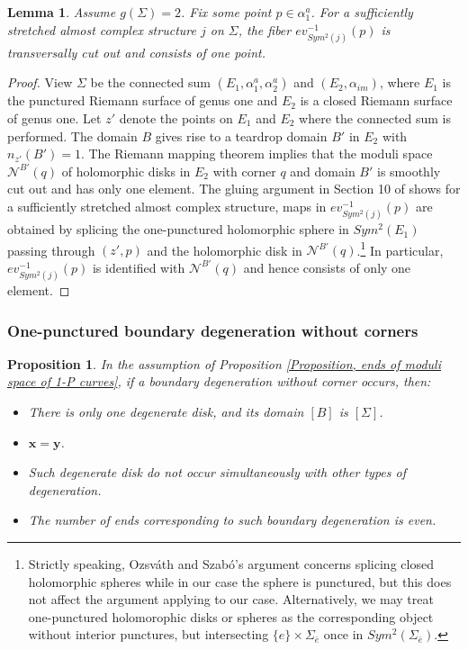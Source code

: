 \documentclass{amsart}
\newtheorem{lem}[thm]{Lemma}
\newtheorem{prop}[thm]{Proposition}
\theoremstyle{definition}
\theoremstyle{remark}
\numberwithin{equation}{section}
\numberwithin{equation}{section} \makeatletter
\begin{document}
\begin{lem}\label{Lemma, fiber of a 1-punctured degenerate disks using sufficiently stretched almost complex structure}
Assume $g(\Sigma)=2$. Fix some point $p\in \alpha^a_1$. For a sufficiently stretched almost complex structure $j$ on $\Sigma$, the fiber $ev_{Sym^2(j)}^{-1}(p)$ is transversally cut out and consists of one point. 
\end{lem}
\begin{proof}
View $\Sigma$ be the connected sum $(E_1,\alpha^a_1,\alpha^a_2)$ and $(E_2,\alpha_{im})$, where $E_1$ is the punctured Riemann surface of genus one and $E_2$ is a closed Riemann surface of genus one. Let $z'$ denote the points on $E_1$ and $E_2$ where the connected sum is performed. The domain $B$ gives rise to a teardrop domain $B'$ in $E_2$ with $n_{z'}(B')=1$. The Riemann mapping theorem implies that the moduli space $\mathcal{N}^{B'}(q)$ of holomorphic disks in $E_2$ with corner $q$ and domain $B'$ is smoothly cut out and has only one element. The gluing argument in Section 10 of \cite{OS04} shows for a sufficiently stretched almost complex structure, maps in $ev_{Sym^2(j)}^{-1}(p)$ are obtained by splicing the one-punctured holomorphic sphere in $Sym^2(E_1)$ passing through $(z',p)$ and the holomorphic disk in $\mathcal{N}^{B'}(q)$.\footnote{Strictly speaking, Ozsv\'ath and Szab\'o's argument concerns splicing closed holomorphic spheres while in our case the sphere is punctured, but this does not affect the argument applying to our case. Alternatively, we may treat one-punctured holomorophic disks or spheres as the corresponding object without interior punctures, but intersecting $\{e\}\times \Sigma_{\bar{e}}$ once in $Sym^2(\Sigma_{\bar{e}})$.} In particular, $ev_{Sym^2(j)}^{-1}(p)$ is identified with $\mathcal{N}^{B'}(q)$ and hence consists of only one element. 
\end{proof}


\subsubsection{One-punctured boundary degeneration without corners}
\begin{prop}\label{Proposition, 1-P curve, boundary degeneration without corners}
In the assumption of Proposition \ref{Proposition, ends of moduli space of 1-P curves}, if a boundary degeneration without corner occurs, then: 
\begin{itemize}
\item[(1)] There is only one degenerate disk, and its domain $[B]$ is $[\Sigma]$. 
\item[(2)] $\bm{x}=\bm{y}$. 
\item[(3)] Such degenerate disk do not occur simultaneously with other types of degeneration.
\item[(4)] The number of ends corresponding to such boundary degeneration is even.
\end{itemize}
\end{prop}
\end{document}
